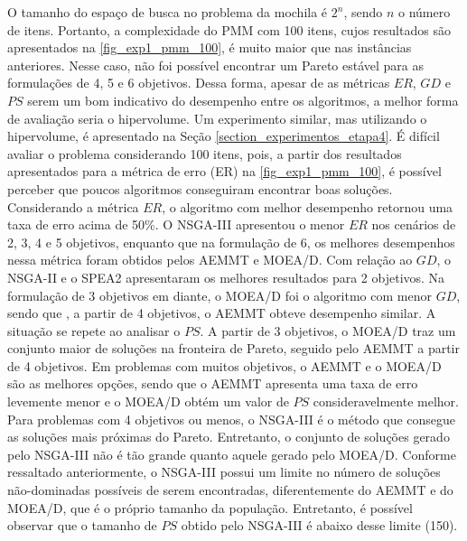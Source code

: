 O tamanho do espaço de busca no problema da mochila é $2^n$, sendo $n$ o número de itens. Portanto, a complexidade do PMM com 100 itens, cujos resultados são apresentados na \autoref{fig_exp1_pmm_100}, é muito maior que nas instâncias anteriores. Nesse caso, não foi possível encontrar um Pareto estável para as formulações de 4, 5 e 6 objetivos. Dessa forma, apesar de as métricas $ER$, $GD$ e $PS$ serem um bom indicativo do desempenho entre os algoritmos, a melhor forma de avaliação seria o hipervolume. Um experimento similar, mas utilizando o hipervolume, é apresentado na Seção \ref{section_experimentos_etapa4}. É difícil avaliar o problema considerando 100 itens, pois, a partir dos resultados apresentados para a métrica de erro (ER) na \autoref{fig_exp1_pmm_100}, é possível perceber que poucos algoritmos conseguiram encontrar boas soluções. Considerando a métrica $ER$, o algoritmo com melhor desempenho retornou uma taxa de erro acima de 50\%. O NSGA-III apresentou o menor $ER$ nos cenários de 2, 3, 4 e 5 objetivos, enquanto que na formulação de 6, os melhores desempenhos nessa métrica foram obtidos pelos AEMMT e MOEA/D. Com relação ao $GD$, o NSGA-II e o SPEA2 apresentaram os melhores resultados para 2 objetivos. Na formulação de 3 objetivos em diante, o MOEA/D foi o algoritmo com menor $GD$, sendo que , a partir de 4 objetivos, o AEMMT obteve desempenho similar. A situação se repete ao analisar o $PS$. A partir de 3 objetivos, o MOEA/D traz um conjunto maior de soluções na fronteira de Pareto, seguido pelo AEMMT a partir de 4 objetivos. Em problemas com muitos objetivos, o AEMMT e o MOEA/D são as melhores opções, sendo que o AEMMT apresenta uma taxa de erro levemente menor e o MOEA/D obtém um valor de $PS$ consideravelmente melhor. Para problemas com 4 objetivos ou menos, o NSGA-III é o método que consegue as soluções mais próximas do Pareto. Entretanto, o conjunto de soluções gerado pelo NSGA-III não é tão grande quanto aquele gerado pelo MOEA/D. Conforme ressaltado anteriormente, o NSGA-III possui um limite no número de soluções não-dominadas possíveis de serem encontradas, diferentemente do AEMMT e do MOEA/D, que é o próprio tamanho da população. Entretanto, é possível observar que o tamanho de $PS$ obtido pelo NSGA-III é abaixo desse limite (150).

